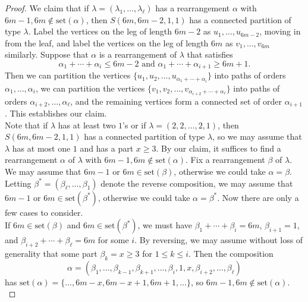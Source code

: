 \documentclass[12pt]{amsart}  %
\theoremstyle{definition}
\theoremstyle{remark}
\numberwithin{equation}{section}
\begin{document}
\begin{proof}
We claim that if $\lambda=(\lambda_1,\ldots,\lambda_\ell)$ has a rearrangement $\alpha$ with $6m-1,6m\notin\text{set}(\alpha)$, then $S(6m,6m-2,1,1)$ has a connected partition of type $\lambda$. Label the vertices on the leg of length $6m-2$ as $u_1,\ldots,u_{6m-2}$, moving in from the leaf, and label the vertices on the leg of length $6m$ as $v_1,\ldots,v_{6m}$ similarly. Suppose that $\alpha$ is a rearrangement of $\lambda$ that satisfies
\begin{equation*}\alpha_1+\cdots+\alpha_i\leq 6m-2\text{ and }\alpha_1+\cdots+\alpha_{i+1}\geq 6m+1.\end{equation*}
Then we can partition the vertices $\{u_1,u_2,\ldots,u_{\alpha_1+\cdots+\alpha_i}\}$ into paths of orders $\alpha_1,\ldots,\alpha_i$, we can partition the vertices $\{v_1,v_2,\ldots,v_{\alpha_{i+2}+\cdots+\alpha_\ell}\}$ into paths of orders $\alpha_{i+2},\ldots,\alpha_\ell$, and the remaining vertices form a connected set of order $\alpha_{i+1}$. This establishes our claim.\\

Note that if $\lambda$ has at least two $1$'s or if $\lambda=(2,2,\ldots,2,1)$, then $S(6m,6m-2,1,1)$ has a connected partition of type $\lambda$, so we may assume that $\lambda$ has at most one $1$ and has a part $x\geq 3$. By our claim, it suffices to find a rearrangement $\alpha$ of $\lambda$ with $6m-1,6m\notin\text{set}(\alpha)$. Fix a rearrangement $\beta$ of $\lambda$. We may assume that $6m-1$ or $6m\in\text{set}(\beta)$, otherwise we could take $\alpha=\beta$. Letting $\beta^*=(\beta_\ell,\ldots,\beta_1)$ denote the reverse composition, we may assume that $6m-1$ or $6m\in\text{set}(\beta^*)$, otherwise we could take $\alpha=\beta^*$. Now there are only a few cases to consider.\\

If $6m\in\text{set}(\beta)$ and $6m\in\text{set}(\beta^*)$, we must have $\beta_1+\cdots+\beta_i=6m$, $\beta_{i+1}=1$,  and $\beta_{i+2}+\cdots+\beta_\ell=6m$ for some $i$. By reversing, we may assume without loss of generality that some part $\beta_k=x\geq 3$ for $1\leq k\leq i$. Then the composition
\begin{equation*}
\alpha=(\beta_1,\ldots,\beta_{k-1},\beta_{k+1},\ldots,\beta_i,1,x,\beta_{i+2},\ldots,\beta_\ell)
\end{equation*}
has $\text{set}(\alpha)=\{\ldots,6m-x,6m-x+1,6m+1,\ldots\}$, so $6m-1,6m\notin\text{set}(\alpha)$.\\


\end{proof}
\end{document}
